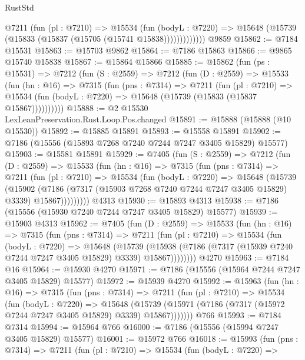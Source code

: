 \begin{lexlean}{RustStd}
\begin{coremodule}
{\begin{coremodule}
{{{{{{{{{{{{{{{{{{{{{{{{{{{{{{{{              @7211
                (fun (pl : @7210) =>
                @15534
                  (fun (bodyL : @7220) =>
                  @15648 (@15739 (@15833 (@15837 (@15705 (@15741 @15838)))))))))))))
    @9859
@15862 := @7184 @15531
@15863 := @15703 @9862
@15864 := @7186 @15863
@15866 := @9865 @15740 @15838
@15867 := @15864 @15866
@15885 := @15862
    (fun (ps : @15531) =>
    @7212
      (fun (S : @2559) =>
      @7212
        (fun (D : @2559) =>
        @15533
          (fun (hn : @16) =>
          @7315
            (fun (pns : @7314) =>
            @7211
              (fun (pl : @7210) =>
              @15534 (fun (bodyL : @7220) => @15648 (@15739 (@15833 (@15837 @15867))))))))))
@15888 := @2 @15530 LexLeanPreservation.Rust.Loop.Pos.changed
@15891 := @15888 (@15888 (@10 @15530))
@15892 := @15885 @15891
@15893 := @15558 @15891
@15902 := @7186 (@15556 (@15893 @7268 @7240 @7244 @7247 @3405 @15829) @15577)
@15903 := @15581 @15891
@15929 := @7405
    (fun (S : @2559) =>
    @7212
      (fun (D : @2559) =>
      @15533
        (fun (hn : @16) =>
        @7315
          (fun (pns : @7314) =>
          @7211
            (fun (pl : @7210) =>
            @15534
              (fun (bodyL : @7220) =>
              @15648
                (@15739
                  (@15902
                    (@7186
                      (@7317 (@15903 @7268 @7240 @7244 @7247 @3405 @15829) @3339)
                      @15867)))))))))
    @4313
@15930 := @15893 @4313
@15938 := @7186 (@15556 (@15930 @7240 @7244 @7247 @3405 @15829) @15577)
@15939 := @15903 @4313
@15962 := @7405
    (fun (D : @2559) =>
    @15533
      (fun (hn : @16) =>
      @7315
        (fun (pns : @7314) =>
        @7211
          (fun (pl : @7210) =>
          @15534
            (fun (bodyL : @7220) =>
            @15648
              (@15739
                (@15938 (@7186 (@7317 (@15939 @7240 @7244 @7247 @3405 @15829) @3339) @15867))))))))
    @4270
@15963 := @7184 @16
@15964 := @15930 @4270
@15971 := @7186 (@15556 (@15964 @7244 @7247 @3405 @15829) @15577)
@15972 := @15939 @4270
@15992 := @15963
    (fun (hn : @16) =>
    @7315
      (fun (pns : @7314) =>
      @7211
        (fun (pl : @7210) =>
        @15534
          (fun (bodyL : @7220) =>
          @15648
            (@15739 (@15971 (@7186 (@7317 (@15972 @7244 @7247 @3405 @15829) @3339) @15867)))))))
    @766
@15993 := @7184 @7314
@15994 := @15964 @766
@16000 := @7186 (@15556 (@15994 @7247 @3405 @15829) @15577)
@16001 := @15972 @766
@16018 := @15993
    (fun (pns : @7314) =>
    @7211
      (fun (pl : @7210) =>
      @15534
        (fun (bodyL : @7220) =>
}}}}}}}}}}}}}}}}}}}}}}}}}}}}}}}}
\end{coremodule}}
\end{coremodule}
\end{lexlean}
